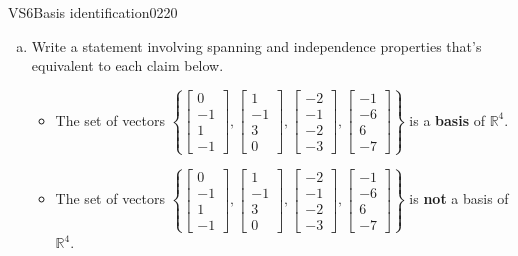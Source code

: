 \newpage




\begin{exercise}{VS6}{Basis identification}{0220} 
\begin{exerciseStatement} 

\begin{enumerate}[(a)]
\item  

 Write a statement involving spanning and independence properties that's equivalent to each claim below. 

 

\begin{itemize}
\item  

 The set of vectors \(\left\{ \left[\begin{array}{c}
0 \\
-1 \\
1 \\
-1
\end{array}\right] , \left[\begin{array}{c}
1 \\
-1 \\
3 \\
0
\end{array}\right] , \left[\begin{array}{c}
-2 \\
-1 \\
-2 \\
-3
\end{array}\right] , \left[\begin{array}{c}
-1 \\
-6 \\
6 \\
-7
\end{array}\right] \right\}\) is a \textbf{basis} of \(\mathbb{R}^4\). 

 
\item  

 The set of vectors \(\left\{ \left[\begin{array}{c}
0 \\
-1 \\
1 \\
-1
\end{array}\right] , \left[\begin{array}{c}
1 \\
-1 \\
3 \\
0
\end{array}\right] , \left[\begin{array}{c}
-2 \\
-1 \\
-2 \\
-3
\end{array}\right] , \left[\begin{array}{c}
-1 \\
-6 \\
6 \\
-7
\end{array}\right] \right\}\) is \textbf{not} a basis of \(\mathbb{R}^4\). 


\end{itemize}
\end{enumerate}
\end{exerciseStatement}
\end{exercise}
